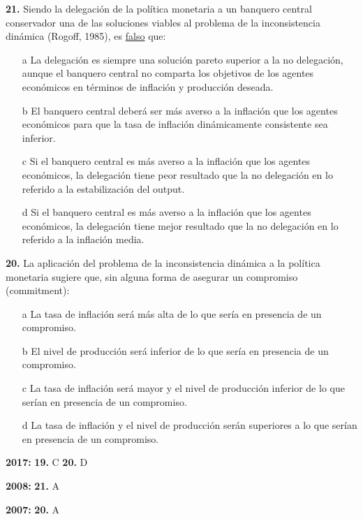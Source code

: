 \documentclass{nuevotema}
\begin{document}

\textbf{21.} Siendo la delegación de la política monetaria a un banquero central conservador una de las soluciones viables al problema de la inconsistencia dinámica (Rogoff, 1985), es \underline{falso} que:

\begin{itemize}
	\item[a] La delegación es siempre una solución pareto superior a la no delegación, aunque el banquero central no comparta los objetivos de los agentes económicos en términos de inflación y producción deseada.
	\item[b] El banquero central deberá ser más averso a la inflación que los agentes económicos para que la tasa de inflación dinámicamente consistente sea inferior.
	\item[c] Si el banquero central es más averso a la inflación que los agentes económicos, la delegación tiene peor resultado que la no delegación en lo referido a la estabilización del output.
	\item[d] Si el banquero central es más averso a la inflación que los agentes económicos, la delegación tiene mejor resultado que la no delegación en lo referido a la inflación media.
\end{itemize}


\textbf{20.} La aplicación del problema de la inconsistencia dinámica a la política monetaria sugiere que, sin alguna forma de asegurar un compromiso (commitment):
\begin{itemize}
	\item[a] La tasa de inflación será más alta de lo que sería en presencia de un compromiso.
	\item[b] El nivel de producción será inferior de lo que sería en presencia de un compromiso.
	\item[c] La tasa de inflación será mayor y el nivel de producción inferior de lo que serían en presencia de un compromiso.
	\item[d] La tasa de inflación y el nivel de producción serán superiores a lo que serían en presencia de un compromiso.
\end{itemize}

\notas

\textbf{2017:} \textbf{19.} C \textbf{20.} D

\textbf{2008:} \textbf{21.} A

\textbf{2007:} \textbf{20.} A


\bibliografia
\end{document}
